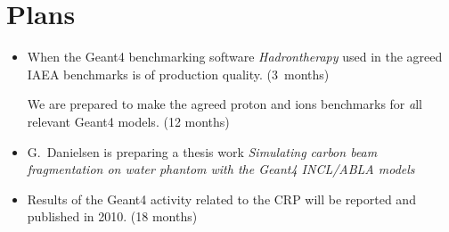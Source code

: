\documentclass[twoside,floatfix,a4wide]{d}
\numberwithin{equation}{section} %
\begin{document}

\section{Plans}
\vspace{-0.4cm}
\begin{itemize}
\item  When the Geant4 benchmarking software {\em Hadrontherapy} used in 
the agreed IAEA benchmarks is of production quality. (3~months)
\begin{itemize}
We are prepared to make the agreed proton and ions 
benchmarks for {\emph all} relevant Geant4 models. (12 months)

\end{itemize}
\item G.~Danielsen is preparing a thesis work 
{\em Simulating carbon beam fragmentation on water phantom with the Geant4 INCL/ABLA models}
\item Results of the Geant4 activity related to the CRP will be reported and published in 2010. (18 months)
\end{itemize}


%  
\end{document}

